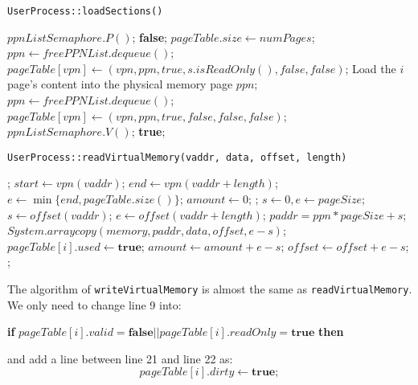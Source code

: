 \documentclass{article}
\begin{document}
\begin{spacing}{1.1}
\begin{algorithm}
  \caption{\texttt{UserProcess::loadSections()}}
  \begin{algorithmic}[1]
    \STATE $ppnListSemaphore.P()$;
    \RETURN \textbf{false};
    \ENDIF
    \STATE $pageTable.size \leftarrow numPages$;
    \STATE $ppn \leftarrow freePPNList.dequeue()$;
    \STATE $pageTable[vpn]\leftarrow(vpn,ppn,true,s.isReadOnly(),false,false)$;
    \STATE Load the $i$ page's content into the physical memory page $ppn$;
    \ENDFOR
    \STATE $ppn \leftarrow freePPNList.dequeue()$;
    \STATE $pageTable[vpn]\leftarrow (vpn,ppn,true, false,false,false)$;
    \ENDFOR
    \STATE $ppnListSemaphore.V()$;
    \RETURN \textbf{true};
  \end{algorithmic}
\end{algorithm}

\begin{algorithm}
  \caption{\texttt{UserProcess::readVirtualMemory(vaddr, data, offset, length)}}
  \begin{algorithmic}[1]
    ;
    \ENDIF
    \STATE $start\leftarrow vpn(vaddr)$;
    \STATE $end\leftarrow vpn(vaddr+length)$;
    \STATE $e\leftarrow \min\{end, pageTable.size()\}$;
    \STATE $amount\leftarrow 0$;
    ;
    \ENDIF
    \STATE $s\leftarrow 0, e\leftarrow pageSize$;
    \STATE $s\leftarrow offset(vaddr)$;
    \ENDIF
    \STATE $e\leftarrow offset(vaddr+length)$;
    \ENDIF
    \STATE $paddr = ppn*pageSize + s$;
    \STATE $System.arraycopy(memory, paddr, data, offset, e-s)$;
    \STATE $pageTable[i].used\leftarrow \textbf{true}$;
    \STATE $amount \leftarrow amount + e - s$;
    \STATE $offset \leftarrow offset + e - s$;
    \ENDFOR
    ;
  \end{algorithmic}
\end{algorithm} 
The algorithm of \texttt{writeVirtualMemory} is almost the same as 
\texttt{readVirtualMemory}.
We only need to change line 9 into: \\
\begin{center}
  \textbf{if} $pageTable[i].valid = \textbf{false} || pageTable[i].readOnly = 
  \textbf{true}$ \textbf{then}
\end{center}
and add a line between line 21 and line 22 as: 
\[ pageTable[i].dirty \leftarrow \textbf{true}; \]


\end{spacing}
\end{document}
